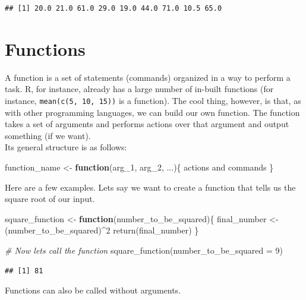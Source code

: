 \documentclass[
]{book}
\newenvironment{Shaded}{\begin{snugshade}}{\end{snugshade}}
\newcommand{\AttributeTok}[1]{\textcolor[rgb]{0.77,0.63,0.00}{#1}}
\newcommand{\CommentTok}[1]{\textcolor[rgb]{0.56,0.35,0.01}{\textit{#1}}}
\newcommand{\ControlFlowTok}[1]{\textcolor[rgb]{0.13,0.29,0.53}{\textbf{#1}}}
\newcommand{\DecValTok}[1]{\textcolor[rgb]{0.00,0.00,0.81}{#1}}
\newcommand{\FunctionTok}[1]{\textcolor[rgb]{0.00,0.00,0.00}{#1}}
\newcommand{\NormalTok}[1]{#1}
\newcommand{\OtherTok}[1]{\textcolor[rgb]{0.56,0.35,0.01}{#1}}
\newcommand{\SpecialCharTok}[1]{\textcolor[rgb]{0.00,0.00,0.00}{#1}}
\begin{document}
\begin{verbatim}
## [1] 20.0 21.0 61.0 29.0 19.0 44.0 71.0 10.5 65.0
\end{verbatim}

\hypertarget{functions}{%
\section{Functions}\label{functions}}

A function is a set of statements (commands) organized in a way to perform a task.
R, for instance, already has a large number of in-built functions (for instance, \texttt{mean(c(5,\ 10,\ 15))} is a function).
The cool thing, however, is that, as with other programming languages, we can build our own function.
The function takes a set of arguments and performs actions over that argument and output something (if we want).\\

Its general structure is as follows:

\begin{Shaded}
\begin{Highlighting}[]
\NormalTok{function\_name }\OtherTok{\textless{}{-}} \ControlFlowTok{function}\NormalTok{(arg\_1, arg\_2, ...)\{}
\NormalTok{   actions and commands}
\NormalTok{\}}
\end{Highlighting}
\end{Shaded}

Here are a few examples.
Lets say we want to create a function that tells us the square root of our input.

\begin{Shaded}
\begin{Highlighting}[]
\NormalTok{square\_function }\OtherTok{\textless{}{-}} \ControlFlowTok{function}\NormalTok{(number\_to\_be\_squared)\{}
\NormalTok{  final\_number }\OtherTok{\textless{}{-}}\NormalTok{ (number\_to\_be\_squared)}\SpecialCharTok{\^{}}\DecValTok{2}
  \FunctionTok{return}\NormalTok{(final\_number)}
\NormalTok{\}}

\CommentTok{\# Now lets call the function}
\FunctionTok{square\_function}\NormalTok{(}\AttributeTok{number\_to\_be\_squared =} \DecValTok{9}\NormalTok{)}
\end{Highlighting}
\end{Shaded}

\begin{verbatim}
## [1] 81
\end{verbatim}

Functions can also be called without arguments.
\end{document}
